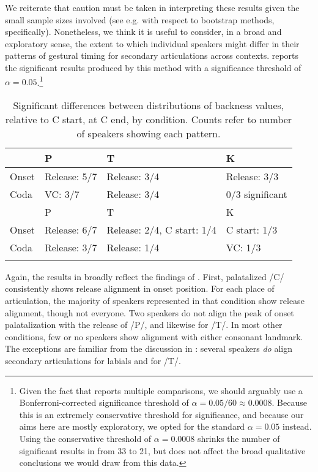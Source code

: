 \documentclass[output=paper,colorlinks,citecolor=brown]{langscibook}
\newcommand{\pal}{\ipa{ʲ}}
\newcommand{\vel}{\ipa{ˠ}}
\begin{document}
We reiterate that caution must be taken in interpreting these results given the small sample sizes involved (see e.g. \citealt[Ch.9]{Chernick2011_bootstrap_methods} with respect to bootstrap methods, specifically). Nonetheless, we think it is useful to consider, in a broad and exploratory sense, the extent to which individual speakers might differ in their patterns of gestural timing for secondary articulations across contexts.  reports the significant results produced by this method with a significance threshold of $\alpha = 0.05$.\footnote{Given the fact that  reports multiple comparisons, we should arguably use a Bonferroni-corrected significance threshold of $\alpha = 0.05/60 \approx 0.0008$. Because this is an extremely conservative threshold for significance, and because our aims here are mostly exploratory, we opted for the standard $\alpha = 0.05$ instead. Using the conservative threshold of $\alpha = 0.0008$ shrinks the number of significant results in  from 33 to 21, but does not affect the broad qualitative conclusions we would draw from this data.
}


\begin{table}
\begin{tabular}{llll}
\lsptoprule
      & P\pal  & T\pal  & K\pal \\\midrule
Onset & Release: 5/7 & Release: 3/4   & Release: 3/3  \\
Coda  & VC: 3/7  &  Release: 3/4  &  0/3 significant\\
\midrule
      & P\vel  & T\vel  & K\vel  \\\midrule
Onset &  Release: 6/7 &  Release: 2/4, C start: 1/4  &  C start: 1/3  \\
Coda  &  Release: 3/7 &  Release: 1/4  &  VC: 1/3\\
\lspbottomrule
\end{tabular}
\caption{Significant differences between distributions of backness values, relative to C start, at C end, by condition. Counts refer to number of speakers showing each pattern.}\label{tab:sig-align}
\end{table}

Again, the results in  broadly reflect the findings of . First, palatalized /C\pal/ consistently shows release alignment in onset position. For each place of articulation, the majority of speakers represented in that condition show release alignment, though not everyone. Two speakers do not align the peak of onset palatalization with the release of /P\pal/, and likewise for /T\pal/. In most other conditions, few or no speakers show alignment with either consonant landmark. The exceptions are familiar from the discussion in : several speakers \emph{do} align secondary articulations for labials and for /T\pal/.
\end{document}
